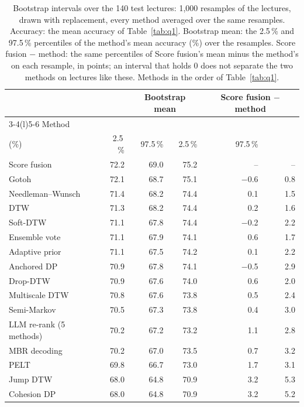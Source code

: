 \begin{table}[t]
\centering
\setlength{\tabcolsep}{1em}
\caption{Bootstrap intervals over the 140 test lectures: 1{,}000 resamples of the lectures, drawn with replacement, every method averaged over the same resamples. Accuracy: the mean accuracy of Table~\ref{tab:q1}. Bootstrap mean: the 2.5\,\% and 97.5\,\% percentiles of the method's mean accuracy (\%) over the resamples. Score fusion $-$ method: the same percentiles of Score fusion's mean minus the method's on each resample, in points; an interval that holds 0 does not separate the two methods on lectures like these. Methods in the order of Table~\ref{tab:q1}.}
\label{tab:bootstrap}
\begin{tabular*}{\linewidth}{@{\extracolsep{\fill}}lrrrrr@{}}
\toprule
 & & \multicolumn{2}{c}{Bootstrap mean} & \multicolumn{2}{c}{Score fusion $-$ method} \\
\cmidrule(lr){3-4}\cmidrule(l){5-6}
Method & \begin{tabular}[b]{@{}r@{}}Accuracy\\(\%)\end{tabular} & 2.5\,\% & 97.5\,\% & 2.5\,\% & 97.5\,\% \\
\midrule
Score fusion & 72.2 & 69.0 & 75.2 & -- & -- \\
Gotoh & 72.1 & 68.7 & 75.1 & $-$0.6 & 0.8 \\
Needleman--Wunsch & 71.4 & 68.2 & 74.4 & 0.1 & 1.5 \\
DTW & 71.3 & 68.2 & 74.4 & 0.2 & 1.6 \\
Soft-DTW & 71.1 & 67.8 & 74.4 & $-$0.2 & 2.2 \\
Ensemble vote & 71.1 & 67.9 & 74.1 & 0.6 & 1.7 \\
Adaptive prior & 71.1 & 67.5 & 74.2 & 0.1 & 2.2 \\
Anchored DP & 70.9 & 67.8 & 74.1 & $-$0.5 & 2.9 \\
Drop-DTW & 70.9 & 67.6 & 74.0 & 0.6 & 2.0 \\
Multiscale DTW & 70.8 & 67.6 & 73.8 & 0.5 & 2.4 \\
Semi-Markov & 70.5 & 67.3 & 73.8 & 0.4 & 3.0 \\
LLM re-rank (5 methods) & 70.2 & 67.2 & 73.2 & 1.1 & 2.8 \\
MBR decoding & 70.2 & 67.0 & 73.5 & 0.7 & 3.2 \\
PELT & 69.8 & 66.7 & 73.0 & 1.7 & 3.1 \\
Jump DTW & 68.0 & 64.8 & 70.9 & 3.2 & 5.3 \\
Cohesion DP & 68.0 & 64.8 & 70.9 & 3.2 & 5.2 \\

\end{tabular*}
\end{table}
